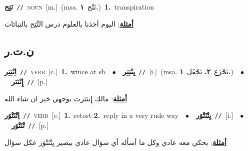 \documentclass[10pt,a4paper,twoside]{article} %
\begin{document}
\begin{multicols}{2}
{{{{{{{{{{{\setlength\topsep{0pt}\textbf{\foreignlanguage{arabic}{نَتِح}}\ {\color{gray}\texttt{//}\color{black}}\ \textsc{noun}\ [m.]\ \color{gray}(msa. \foreignlanguage{arabic}{نَتْح}~\foreignlanguage{arabic}{\textbf{١.}})\color{black}\ \textbf{1.}~transpiration\  \begin{flushright}\color{gray}\foreignlanguage{arabic}{\textbf{\underline{\foreignlanguage{arabic}{أمثلة}}}: اليوم أخذنا بالعلوم درس النَّتِح بالنباتات}\end{flushright}\color{black}} \vspace{2mm}

\vspace{-3mm}
\subsection*{\color{blue}\foreignlanguage{arabic}{ن.ت.ر}\color{blue}{}} 

{\setlength\topsep{0pt}\textbf{\foreignlanguage{arabic}{اِنْتِتِر}}\ {\color{gray}\texttt{//}\color{black}}\ \textsc{verb}\ [c.]\ \textbf{1.}~wince at sb\ \ $\bullet$\ \ \setlength\topsep{0pt}\textbf{\foreignlanguage{arabic}{يِنْتِتِر}}\ {\color{gray}\texttt{//}\color{black}}\ [i.]\ \color{gray}(msa. \foreignlanguage{arabic}{يَجْزَع}~\foreignlanguage{arabic}{\textbf{٢.}}  \foreignlanguage{arabic}{يَجْفَل}~\foreignlanguage{arabic}{\textbf{١.}})\color{black}\ \ $\bullet$\ \ \setlength\topsep{0pt}\textbf{\foreignlanguage{arabic}{إِنْتَتَر}}\ {\color{gray}\texttt{//}\color{black}}\ [p.]\  \begin{flushright}\color{gray}\foreignlanguage{arabic}{\textbf{\underline{\foreignlanguage{arabic}{أمثلة}}}: مالك إِنتَتَرت بوجهي خير ان شاء الله}\end{flushright}\color{black}} \vspace{2mm}

{\setlength\topsep{0pt}\textbf{\foreignlanguage{arabic}{اِتْنَتْوَر}}\ {\color{gray}\texttt{//}\color{black}}\ \textsc{verb}\ [c.]\ \textbf{1.}~retort  \textbf{2.}~reply in a very rude way\ \ $\bullet$\ \ \setlength\topsep{0pt}\textbf{\foreignlanguage{arabic}{يِتْنَتْوَر}}\ {\color{gray}\texttt{//}\color{black}}\ [i.]\ \ $\bullet$\ \ \setlength\topsep{0pt}\textbf{\foreignlanguage{arabic}{تْنَتْوَر}}\ {\color{gray}\texttt{//}\color{black}}\ [p.]\  \begin{flushright}\color{gray}\foreignlanguage{arabic}{\textbf{\underline{\foreignlanguage{arabic}{أمثلة}}}: بحكي معه عادي وكل ما أسأله أي سؤال عادي بيصير يِتْنَتْوَر عكل سؤال}\end{flushright}\color{black}} \vspace{2mm}

}}}}}}}}}}
\end{multicols}
\end{document}
